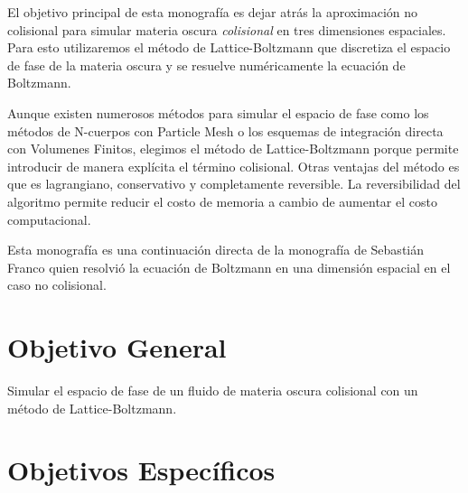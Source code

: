 \documentclass[12pt]{article}
\begin{document}
El objetivo principal de esta monografía es dejar atr\'as la aproximaci\'on
no colisional para simular materia oscura \emph{colisional} en tres
dimensiones espaciales.
Para esto utilizaremos el m\'etodo de Lattice-Boltzmann 
que  discretiza el espacio de fase de la materia oscura y se
resuelve numéricamente la ecuación de Boltzmann. 


Aunque existen numerosos métodos para simular el espacio de fase como
los métodos de N-cuerpos con Particle Mesh o los esquemas de
integración directa con Volumenes Finitos, elegimos el m\'etodo de
Lattice-Boltzmann porque permite introducir de manera expl\'icita el
t\'ermino colisional.
Otras ventajas del m\'etodo es que es lagrangiano,
conservativo y completamente reversible\cite{integerLatticeDynamics}.
La reversibilidad del algoritmo permite reducir el
costo de memoria a cambio de aumentar el costo computacional. 

Esta monografía es una continuaci\'on directa de la monografía de Sebasti\'an
Franco \cite{franco} quien resolvi\'o la ecuaci\'on de Boltzmann en
una dimensi\'on espacial en el caso no colisional.





\section{Objetivo General}


Simular el espacio de fase de un fluido de materia oscura colisional con un método de Lattice-Boltzmann.



\section{Objetivos Específicos}
\end{document}
